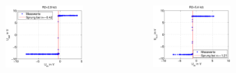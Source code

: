 \begin{frame}
\begin{columns}[c]
\begin{figure}[H]
\begin{center}
    \end{center}
    \end{figure}
    \begin{figure}[H]
    \begin{center}
            \includegraphics[scale=0.32]{./img/plots/Auf_1_2_9_Ohm.eps}
    \end{center}
    \end{figure}
    \begin{figure}[H]
    \begin{center}
            \includegraphics[scale=0.32]{./img/plots/Auf_1_5_4_Ohm.eps}
    \end{center}
    \end{figure}
        
    \end{columns}
\end{frame}

